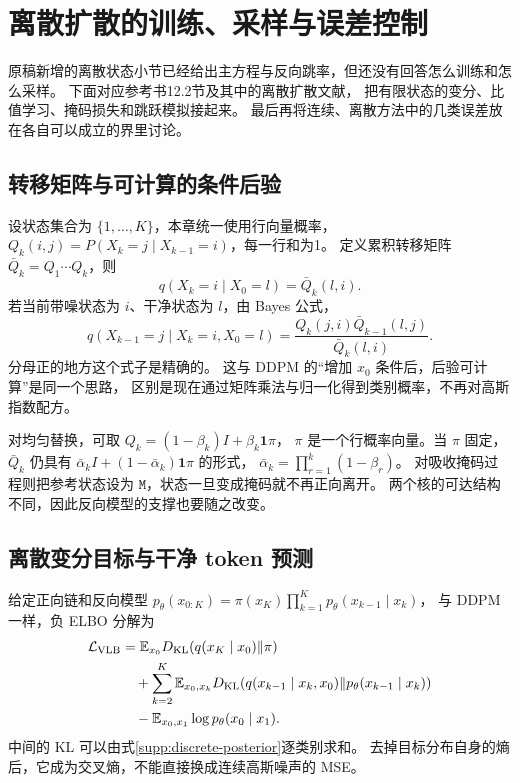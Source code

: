 \chapter{离散扩散的训练、采样与误差控制}
\label{supp:discrete}

原稿新增的离散状态小节已经给出主方程与反向跳率，但还没有回答怎么训练和怎么采样。
下面对应参考书12.2节及其中的离散扩散文献，
把有限状态的变分、比值学习、掩码损失和跳跃模拟接起来。
最后再将连续、离散方法中的几类误差放在各自可以成立的界里讨论。
\cite{theorybook,sedd,mdlm}

\section{转移矩阵与可计算的条件后验}
设状态集合为 $\{1,\ldots,K\}$，本章统一使用行向量概率，
$Q_k(i,j)=P(X_k=j\mid X_{k-1}=i)$，每一行和为1。
定义累积转移矩阵 $\bar Q_k=Q_1\cdots Q_k$，则
\[
q(X_k=i\mid X_0=l)=\bar Q_k(l,i).
\]
若当前带噪状态为 $i$、干净状态为 $l$，由 Bayes 公式，
\[
q(X_{k-1}=j\mid X_k=i,X_0=l)
=\frac{Q_k(j,i)\bar Q_{k-1}(l,j)}{\bar Q_k(l,i)}.
\label{supp:discrete-posterior}
\]
分母正的地方这个式子是精确的。
这与 DDPM 的“增加 $x_0$ 条件后，后验可计算”是同一个思路，
区别是现在通过矩阵乘法与归一化得到类别概率，不再对高斯指数配方。

对均匀替换，可取 $Q_k=(1-\beta_k)I+\beta_k\mathbf1\pi$，
$\pi$ 是一个行概率向量。当 $\pi$ 固定，$\bar Q_k$ 仍具有
$\bar\alpha_kI+(1-\bar\alpha_k)\mathbf1\pi$ 的形式，
$\bar\alpha_k=\prod_{r=1}^k(1-\beta_r)$。
对吸收掩码过程则把参考状态设为 $\mathtt M$，状态一旦变成掩码就不再正向离开。
两个核的可达结构不同，因此反向模型的支撑也要随之改变。

\section{离散变分目标与干净 token 预测}
给定正向链和反向模型
$p_\theta(x_{0:K})=\pi(x_K)\prod_{k=1}^Kp_\theta(x_{k-1}\mid x_k)$，
与 DDPM 一样，负 ELBO 分解为
\begin{align}
\mathcal L_{\rm VLB}
 &=\mathbb E_{x_0}D_{\rm KL}(q(x_K\mid x_0)\|\pi)\\
 &\quad+\sum_{k=2}^K\mathbb E_{x_0,x_k}
 D_{\rm KL}(q(x_{k-1}\mid x_k,x_0)\|p_\theta(x_{k-1}\mid x_k))\\
 &\quad-\mathbb E_{x_0,x_1}\log p_\theta(x_0\mid x_1).
\end{align}
中间的 KL 可以由式\eqref{supp:discrete-posterior}逐类别求和。
去掉目标分布自身的熵后，它成为交叉熵，不能直接换成连续高斯噪声的 MSE。

